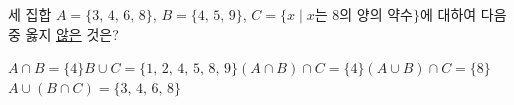 세 집합 $A=\{3,\,4,\,6,\,8\}$, $B=\{4,\,5,\,9\}$, $C=\{x \mid x$는 $8$의 양의 약수$\}$에 대하여 다음 중 옳지 \underline{않은} 것은?
\begin{choicesv}{$A\cap B=\{4\}$}{$B\cup C=\{1,\,2,\,4,\,5,\,8,\,9\}$}{$(A\cap B)\cap C=\{4\}$}{$(A\cup B)\cap C=\{8\}$}{$A\cup(B\cap C)=\{3,\,4,\,6,\,8\}$}\end{choicesv}
